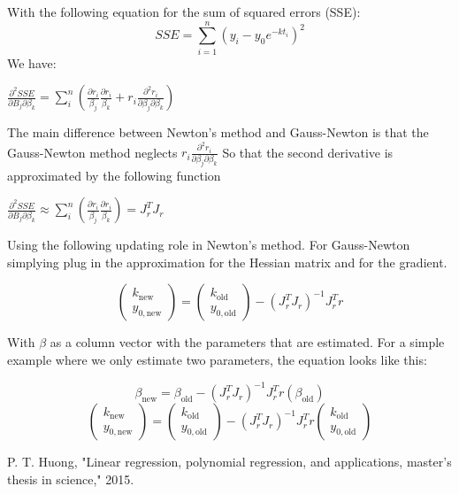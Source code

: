 \documentclass[conference]{IEEEtran}
\begin{document}
With the following equation for the sum of squared errors (SSE):
\[
    SSE = \sum_{i=1}^{n} (y_i - y_0 e^{-kt_i})^2
\]
We have:
\begin{center}

    \(
    \frac{\partial^2 {SSE}}{\partial B_j \partial \beta_k} = \sum_{i}^{n}(\frac{\partial r_i}{\beta_j}\frac{\partial r_i}{\beta_k} + r_i\frac{\partial^2 r_i}{\partial \beta_j \partial \beta_k})
    \)

\end{center}
The main difference between Newton's method and Gauss-Newton is that the Gauss-Newton method neglects \(r_i\frac{\partial^2 r_i}{\partial \beta_j \partial \beta_k}\)
So that the second derivative is approximated by the following function
\begin{center}

    \(
    \frac{\partial^2 {SSE}}{\partial B_j \partial \beta_k} \approx \sum_{i}^{n}(\frac{\partial r_i}{\beta_j}\frac{\partial r_i}{\beta_k}) = J^T_rJ_r
    \)

\end{center}

Using the following updating  role in Newton's method.  For Gauss-Newton simplying plug in the approximation for the Hessian matrix and for the gradient.

\begin{center}
    \[
        \begin{pmatrix}
            k_{\text{new}} \\ y_{0,\text{new}}
        \end{pmatrix} =
        \begin{pmatrix}
            k_{\text{old}} \\ y_{0,\text{old}}
        \end{pmatrix} - (J^T_r J_r)^{-1} J^T_r r
    \]
\end{center}

With \(\beta\) as a column vector with the parameters that are estimated. For a simple example where we only estimate two parameters, the equation looks like this:

\begin{center}
    \[
        \beta_{\text{new}} = \beta_{\text{old}} - (J^T_r J_r)^{-1} J^T_r r(\beta_{\text{old}})
    \]
    \[
        \begin{pmatrix}
            k_{\text{new}} \\ y_{0,\text{new}}
        \end{pmatrix} =
        \begin{pmatrix}
            k_{\text{old}} \\ y_{0,\text{old}}
        \end{pmatrix} - (J^T_r J_r)^{-1} J^T_r r \begin{pmatrix}
            k_{\text{old}} \\ y_{0,\text{old}}
        \end{pmatrix}
    \]
\end{center}


\begin{thebibliography}{00}
      P. T. Huong, "Linear regression, polynomial regression, and applications,
    master’s thesis in science," 2015.
\end{thebibliography}
\end{document}
